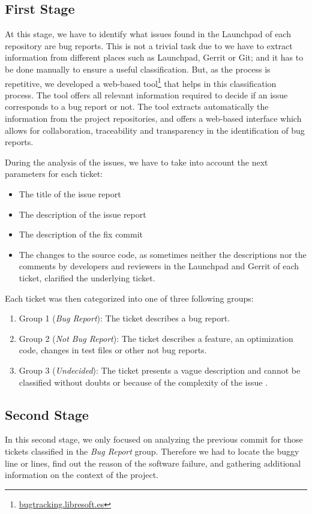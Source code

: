 \documentclass[ifip]{svmult}
\begin{document}
\subsection{First Stage}
\label{subsec:first}

At this stage, we have to identify what issues found in the Launchpad of each repository are bug reports. This is not a trivial task due to we have to extract information from different places such as Launchpad, Gerrit or Git; and it has to be done manually to ensure a useful classification. But, as the process is repetitive, we developed a web-based tool\footnote{\url{bugtracking.libresoft.es}} that helps in this classification process. The tool offers all relevant information required to decide if an issue corresponds to a bug report or not. The tool extracts automatically the information from the project repositories, and offers a web-based interface which allows for collaboration, traceability and transparency in the identification of bug reports.

During the analysis of the issues, we have to take into account the next parameters for each ticket:

\begin{itemize}
  \item The title of the issue report
  \item The description of the issue report
  \item The description of the fix commit
  \item The changes to the source code, as sometimes neither the descriptions nor the comments by developers and reviewers in the Launchpad and Gerrit of each ticket, clarified the underlying ticket.
\end{itemize}

Each ticket was then categorized into one of three following groups:

\begin{enumerate}
  \item Group 1 (\textit{Bug Report}): The ticket describes a bug report.
  \item Group 2 (\textit{Not Bug Report}): The ticket describes a feature, an optimization code, changes in test files or other not bug reports.
  \item Group 3 (\textit{Undecided}): The ticket presents a vague description and cannot be classified without doubts or because of the complexity of the issue .
\end{enumerate}

\subsection{Second Stage}
\label{subsec:second}
In this second stage, we only focused on analyzing the previous commit for those tickets classified in the \textit{Bug Report} group. Therefore we had to locate the buggy line or lines, find out the reason of the software failure, and gathering additional information on the context of the project.
\end{document}
